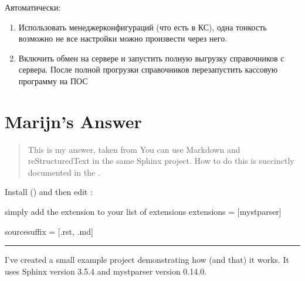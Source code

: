\documentclass[twoside,11pt,a4paper,notitlepage]{report}
\begin{document}
\sphinxAtStartPar
Автоматически:
\begin{enumerate}
%
\item {} 
\sphinxAtStartPar
Использовать менеджер\sphinxhyphen{}конфигураций (что есть в КС), одна тонкость \sphinxhyphen{} возможно не все настройки можно произвести через него.

\item {} 
\sphinxAtStartPar
Включить обмен на сервере и запустить полную выгрузку справочников с сервера. После полной прогрузки справочников \sphinxhyphen{} перезапустить кассовую программу на ПОС

\end{enumerate}

\sphinxstepscope


\chapter{Marijn’s Answer}
\label{\detokenize{test:marijn-s-answer}}\label{\detokenize{test::doc}}\begin{quote}

\sphinxAtStartPar
This is my answer, taken from 
You can use Markdown and reStructuredText in the same Sphinx project.
How to do this is succinctly documented in the .
\end{quote}

\sphinxAtStartPar
Install  () and then edit :

\begin{sphinxVerbatim}[commandchars=\\\{\}]
\PYGZsh{} simply add the extension to your list of extensions
extensions = [\PYGZsq{}myst\PYGZus{}parser\PYGZsq{}]

source\PYGZus{}suffix = [\PYGZsq{}.rst\PYGZsq{}, \PYGZsq{}.md\PYGZsq{}]
\end{sphinxVerbatim}


\bigskip\hrule\bigskip


\sphinxAtStartPar
I’ve created a small example project  demonstrating how (and that) it works. It uses Sphinx version 3.5.4 and myst\sphinxhyphen{}parser version 0.14.0.
\end{document}
